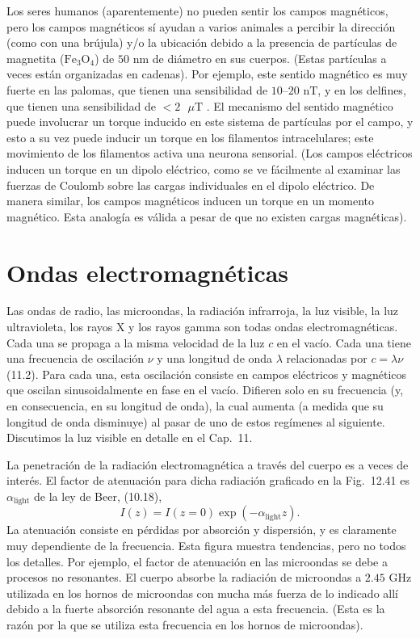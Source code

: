 \documentclass[12pt]{book}
\begin{document}
Los seres humanos (aparentemente) no pueden sentir los campos magnéticos, pero los campos magnéticos sí ayudan a varios animales a percibir la dirección (como con una brújula) y/o la ubicación debido a la presencia de partículas de magnetita ($\text{Fe}_3\text{O}_4$) de $50\text{ nm}$ de diámetro en sus cuerpos. (Estas partículas a veces están organizadas en cadenas). Por ejemplo, este sentido magnético es muy fuerte en las palomas, que tienen una sensibilidad de $10\text{--}20\text{ nT}$, y en los delfines, que tienen una sensibilidad de $<2\text{ }\mu\text{T}$ \cite{1}. El mecanismo del sentido magnético puede involucrar un torque inducido en este sistema de partículas por el campo, y esto a su vez puede inducir un torque en los filamentos intracelulares; este movimiento de los filamentos activa una neurona sensorial. (Los campos eléctricos inducen un torque en un dipolo eléctrico, como se ve fácilmente al examinar las fuerzas de Coulomb sobre las cargas individuales en el dipolo eléctrico. De manera similar, los campos magnéticos inducen un torque en un momento magnético. Esta analogía es válida a pesar de que no existen cargas magnéticas).

\section{Ondas electromagnéticas}

Las ondas de radio, las microondas, la radiación infrarroja, la luz visible, la luz ultravioleta, los rayos X y los rayos gamma son todas ondas electromagnéticas. Cada una se propaga a la misma velocidad de la luz $c$ en el vacío. Cada una tiene una frecuencia de oscilación $\nu$ y una longitud de onda $\lambda$ relacionadas por $c = \lambda\nu$ (11.2). Para cada una, esta oscilación consiste en campos eléctricos y magnéticos que oscilan sinusoidalmente en fase en el vacío. Difieren solo en su frecuencia (y, en consecuencia, en su longitud de onda), la cual aumenta (a medida que su longitud de onda disminuye) al pasar de uno de estos regímenes al siguiente. Discutimos la luz visible en detalle en el Cap.~11.

La penetración de la radiación electromagnética a través del cuerpo es a veces de interés. El factor de atenuación para dicha radiación graficado en la Fig.~12.41 es $\alpha_{\text{light}}$ de la ley de Beer, (10.18),
\begin{equation}
I(z) = I(z = 0) \exp(-\alpha_{\text{light}} z).
\label{eq:12.93}
\end{equation}
La atenuación consiste en pérdidas por absorción y dispersión, y es claramente muy dependiente de la frecuencia. Esta figura muestra tendencias, pero no todos los detalles. Por ejemplo, el factor de atenuación en las microondas se debe a procesos no resonantes. El cuerpo absorbe la radiación de microondas a $2.45\text{ GHz}$ utilizada en los hornos de microondas con mucha más fuerza de lo indicado allí debido a la fuerte absorción resonante del agua a esta frecuencia. (Esta es la razón por la que se utiliza esta frecuencia en los hornos de microondas).
\end{document}
